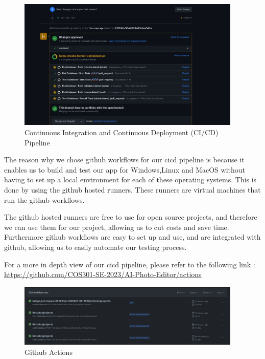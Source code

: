 \documentclass[11pt,a4paper]{article}
\begin{document}
\begin{figure}[htbp]
  \centering
  \includegraphics[width=0.95\textwidth]{../pics/cicd.png}
  \caption{Continuous Integration and Continuous Deployment (CI/CD) Pipeline}
\end{figure}

The reason why we chose github workflows for our cicd pipeline is because it
enables us to build and test our app for Windows,Linux and MacOS without having
to set up a local environment for each of these operating systems. This is done
by using the github hosted runners. These runners are virtual machines that run
the github workflows. 

The github hosted runners are free to use for open source projects, and
therefore we can use them for our project, allowing us to cut costs and save
time. Furthermore github workflows are easy to set up and use, and are
integrated with github, allowing us to easily automate our testing process.

For a more in depth view of our cicd pipeline, please refer to the following
link : \url{https://github.com/COS301-SE-2023/AI-Photo-Editor/actions}

\begin{figure}[H]
  \centering
  \includegraphics[width=0.95\textwidth]{../pics/actions.png}
  \caption{Github Actions}
\end{figure}

\pagebreak
\end{document}
